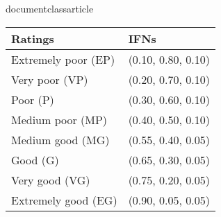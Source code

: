 documentclass{article}\
 \usepackage{multirow}
  
  \begin{tabular}{ p{6cm}|p{2.5cm}}
 \hline
 
    Ratings & IFNs \\
     \hline
   Extremely poor (EP) & (0.10, 0.80, 0.10)\\
   Very poor (VP) & (0.20, 0.70, 0.10) \\
    Poor (P) &  (0.30, 0.60, 0.10) \\
    Medium poor (MP) & (0.40, 0.50, 0.10)\\
    Medium good (MG)  & (0.55, 0.40, 0.05)\\
   Good (G)  &  (0.65, 0.30, 0.05)\\
    Very good (VG)  & (0.75, 0.20, 0.05)  \\
     Extremely good (EG) & (0.90, 0.05, 0.05)
    
    \hline
 \end{tabular}
 

 
